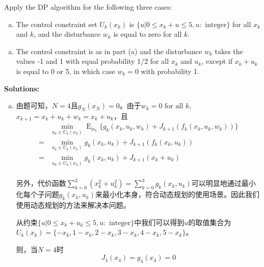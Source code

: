 \documentclass{article}
\begin{document}
    Apply the DP algorithm for the following three cases:
    \begin{enumerate}[(a)]
        \item The control constraint set $U_k(x_k)$ is $\{u|0\leq x_k+u\leq5, u:\text{ integer}\}$ for all $x_k$ and $k$, and the disturbance $w_k$ is equal to zero for all $k$. 
    \end{enumerate}
    \begin{enumerate}[(c)]
        \item The control constraint is as in part (a) and the disturbance $w_k$ takes the values -1 and 1 with equal probability 1/2 for all $x_k$ and $u_k$, except if $x_k+u_k$ is equal to 0 or 5,  in which case $w_k=0$ with probability 1.
    \end{enumerate}
    \textbf{Solutions:}
    \begin{enumerate}[(a)]
        \item 由题可知，$N=4$且$g_N(x_N)=0$。由于$w_k=0 \text{ for all }k$, $x_{k+1}=x_k+u_k+w_k=x_k+u_k$，且
            \begin{equation}
                \begin{split}
                    &\min_{u_k\in U_k(x_k)}\mathop{E}_{w_k}\big\{g_k(x_k,u_k,w_k)+J_{k+1}(f_k(x_k, u_k, w_k))\big\}\\
                    =&\min_{u_k\in U_k(x_k)}g_k(x_k,u_k)+J_{k+1}(f_k(x_k, u_k))\\
                    =&\min_{u_k\in U_k(x_k)}g_k(x_k,u_k)+J_{k+1}(x_k+u_k)\\
                \end{split}
            \end{equation}
        
            另外，代价函数$\sum_{k=0}^3(x_k^2+u_k^2)=\sum_{k=0}^3g_k(x_k,u_k)$可以明显地通过最小化每个子问题$g_k(x_k,u_k)$来最小化本身，符合动态规划的使用场景。因此我们使用动态规划的方法来解决本问题。    

            从约束$\{u|0\leq x_k+u_k\leq 5, u:\text{ integer}\}$中我们可以得到$u$的取值集合为$U_k(x_k)=\{-x_k, 1-x_k, 2-x_k, 3-x_k, 4-x_k, 5-x_k\}$。
        
            则，当$N=4$时
            \begin{equation}
                J_4(x_4)=g_4(x_4)=0
            \end{equation}


\end{enumerate}
\end{document}

